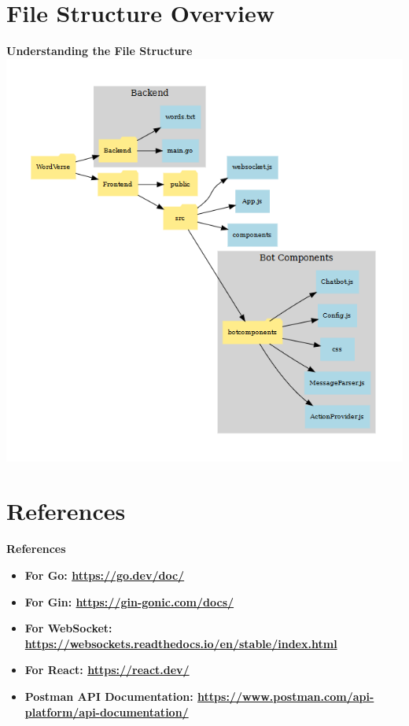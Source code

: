 \documentclass{beamer}
\begin{document}
\section{File Structure Overview}
\begin{frame}{\bfseries Understanding the File Structure}
    \includegraphics[scale=0.4]{struc.png}
\end{frame}

\section{References}

\begin{frame}{\bfseries References}
    \begin{itemize}
        \item \bfseries For Go: \url{https://go.dev/doc/}
        \item \bfseries For Gin: \url{https://gin-gonic.com/docs/}
        \item \bfseries For WebSocket: \url{https://websockets.readthedocs.io/en/stable/index.html}
        \item \bfseries For React: \url{https://react.dev/}
        \item \bfseries Postman API Documentation: \url{https://www.postman.com/api-platform/api-documentation/}
    \end{itemize}
\end{frame}

\begin{frame}
    \begin{center}
        \LARGE
    \end{center}
\end{frame}
\end{document}
